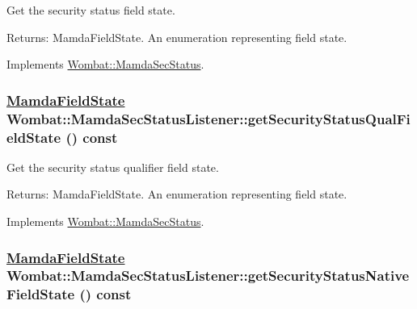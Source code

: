 Get the security status field state. 

\begin{Desc}
\item[Returns:]Mamda\-Field\-State. An enumeration representing field state. \end{Desc}


Implements \hyperlink{classWombat_1_1MamdaSecStatus_1b7b8b27b2bf2302c50b34261af61f39}{Wombat::Mamda\-Sec\-Status}.\hypertarget{classWombat_1_1MamdaSecStatusListener_96338fb8e8ae1b6ab9d8ca695f711925}{
\subsubsection[getSecurityStatusQualFieldState]{\setlength{\rightskip}{0pt plus 5cm}\hyperlink{namespaceWombat_93aac974f2ab713554fd12a1fa3b7d2a}{Mamda\-Field\-State} Wombat::Mamda\-Sec\-Status\-Listener::get\-Security\-Status\-Qual\-Field\-State () const}}
\label{classWombat_1_1MamdaSecStatusListener_96338fb8e8ae1b6ab9d8ca695f711925}


Get the security status qualifier field state. 

\begin{Desc}
\item[Returns:]Mamda\-Field\-State. An enumeration representing field state. \end{Desc}


Implements \hyperlink{classWombat_1_1MamdaSecStatus_2552980479d78154cf754c3bcf4647c3}{Wombat::Mamda\-Sec\-Status}.\hypertarget{classWombat_1_1MamdaSecStatusListener_6ceb039c9b33e50e458383e108670f67}{
\subsubsection[getSecurityStatusNativeFieldState]{\setlength{\rightskip}{0pt plus 5cm}\hyperlink{namespaceWombat_93aac974f2ab713554fd12a1fa3b7d2a}{Mamda\-Field\-State} Wombat::Mamda\-Sec\-Status\-Listener::get\-Security\-Status\-Native\-Field\-State () const}}
\label{classWombat_1_1MamdaSecStatusListener_6ceb039c9b33e50e458383e108670f67}


